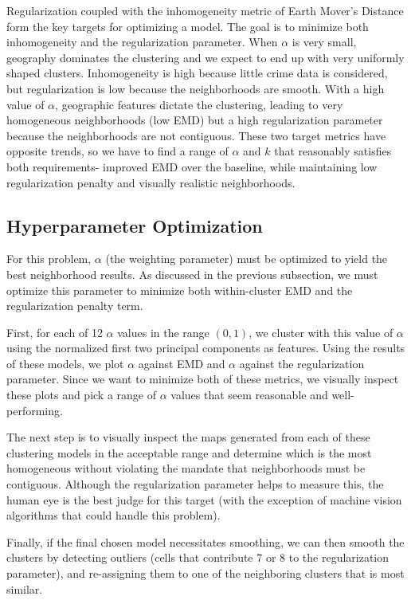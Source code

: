 \documentclass[times new roman,12pt]{article}
\begin{document}
Regularization coupled with the inhomogeneity metric of Earth Mover's Distance form the key targets for optimizing a model. The goal is to minimize both inhomogeneity and the regularization parameter. When $\alpha$ is very small, geography dominates the clustering and we expect to end up with very uniformly shaped clusters. Inhomogeneity is high because little crime data is considered, but regularization is low because the neighborhoods are smooth. With a high value of $\alpha$, geographic features dictate the clustering, leading to very homogeneous neighborhoods (low EMD) but a high regularization parameter because the neighborhoods are not contiguous. These two target metrics have opposite trends, so we have to find a range of $\alpha$ and $k$ that reasonably satisfies both requirements- improved EMD over the baseline, while maintaining low regularization penalty and visually realistic neighborhoods.

\subsection{Hyperparameter Optimization}
\label{hyper}

For this problem, $\alpha$ (the weighting parameter) must be optimized to yield the best neighborhood results. As discussed in the previous subsection, we must optimize this parameter to minimize both within-cluster EMD and the regularization penalty term. 

First, for each of 12 $\alpha$ values in the range $(0,1)$, we cluster with this value of $\alpha$ using the normalized first two principal components as features. Using the results of these models, we plot $\alpha$ against EMD and $\alpha$ against the regularization parameter. Since we want to minimize both of these metrics, we visually inspect these plots and pick a range of $\alpha$ values that seem reasonable and well-performing.

The next step is to visually inspect the maps generated from each of these clustering models in the acceptable range and determine which is the most homogeneous without violating the mandate that neighborhoods must be contiguous. Although the regularization parameter helps to measure this, the human eye is the best judge for this target (with the exception of machine vision algorithms that could handle this problem). 

Finally, if the final chosen model necessitates smoothing, we can then smooth the clusters by detecting outliers (cells that contribute 7 or 8 to the regularization parameter), and re-assigning them to one of the neighboring clusters that is most similar. 
\end{document}
